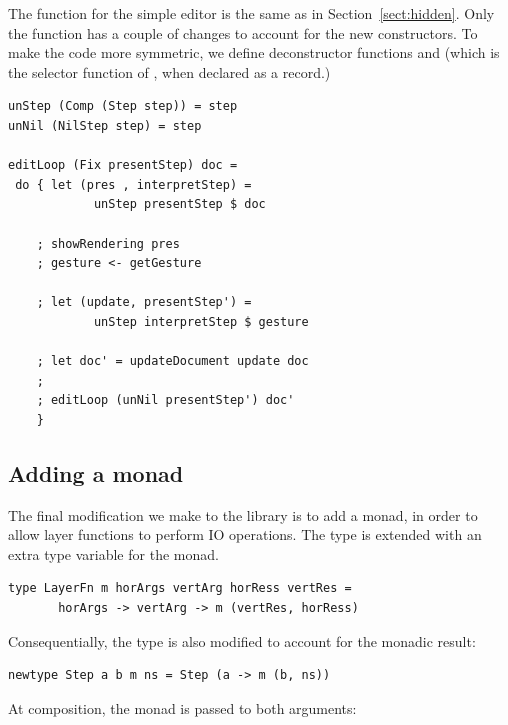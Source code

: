 \documentclass[preprint,natbib]{sigplanconf}
\begin{document}
The  function for the simple editor is the same as in Section~\ref{sect:hidden}. Only the  function has a couple of changes to account for the new constructors. To make the code more symmetric, we define deconstructor functions  and  (which is the selector function of , when declared as a record.)

\begin{small}
\begin{verbatim}
unStep (Comp (Step step)) = step
unNil (NilStep step) = step

editLoop (Fix presentStep) doc = 
 do { let (pres , interpretStep) = 
            unStep presentStep $ doc
    
    ; showRendering pres
    ; gesture <- getGesture
    
    ; let (update, presentStep') =
            unStep interpretStep $ gesture
    
    ; let doc' = updateDocument update doc
    ; 
    ; editLoop (unNil presentStep') doc'
    }
\end{verbatim}%
\end{small}



%																
\subsection{Adding a monad}


The final modification we make to the library is to add a monad, in order to allow layer functions to perform IO operations. The type  is extended with an extra type variable  for the monad.

\begin{small}
\begin{verbatim}
type LayerFn m horArgs vertArg horRess vertRes =
       horArgs -> vertArg -> m (vertRes, horRess)
\end{verbatim}
\end{small}

Consequentially, the  type is also modified to account for the monadic result:

\begin{small}
\begin{verbatim}
newtype Step a b m ns = Step (a -> m (b, ns))
\end{verbatim}
\end{small}

At composition, the monad is passed to both arguments:
\end{document}
